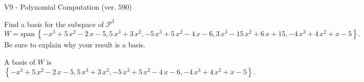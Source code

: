 \begin{exercise}
  \begin{exerciseTitle}V9 - Polynomial Computation (ver. 590)\end{exerciseTitle}
  \begin{exerciseStatement}
    Find a basis for the subspace of \(\mathcal{P}^3\) 
\[W=\mathrm{span}\ \left\{-x^{3} + 5 \, x^{2} - 2 \, x - 5 , 5 \, x^{3} + 3 \, x^{2} , -5 \, x^{3} + 5 \, x^{2} - 4 \, x - 6 , 3 \, x^{3} - 15 \, x^{2} + 6 \, x + 15 , -4 \, x^{3} + 4 \, x^{2} + x - 5\right\}.\]
 Be sure to explain why your result is a basis.


  \end{exerciseStatement}
  \begin{exerciseAnswer}
   A basis of \(W\) is  \(\left\{-x^{3} + 5 \, x^{2} - 2 \, x - 5 , 5 \, x^{3} + 3 \, x^{2} , -5 \, x^{3} + 5 \, x^{2} - 4 \, x - 6 , -4 \, x^{3} + 4 \, x^{2} + x - 5\right\}\).
  


  \end{exerciseAnswer}
\end{exercise}